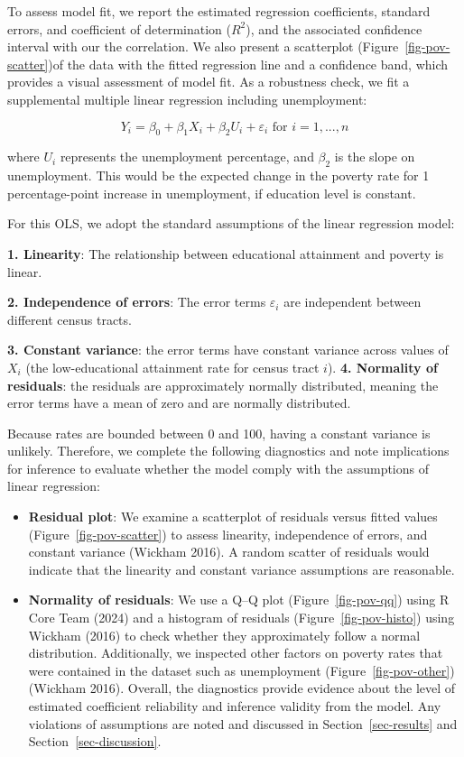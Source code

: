 \documentclass[
  letterpaper,
  DIV=11,
  numbers=noendperiod]{scrartcl}
\begin{document}
To assess model fit, we report the estimated regression coefficients,
standard errors, and coefficient of determination (\(R^2\)), and the
associated confidence interval with our the correlation. We also present
a scatterplot (Figure~\ref{fig-pov-scatter})of the data with the fitted
regression line and a confidence band, which provides a visual
assessment of model fit. As a robustness check, we fit a supplemental
multiple linear regression including unemployment:

\[Y_i = \beta_0 + \beta_1X_i + \beta_2U_i +\varepsilon_i \text{ for }i=1,...,n\]

where \(U_i\) represents the unemployment percentage, and \(\beta_2\) is
the slope on unemployment. This would be the expected change in the
poverty rate for 1 percentage-point increase in unemployment, if
education level is constant.

For this OLS, we adopt the standard assumptions of the linear regression
model:

\textbf{1. Linearity}: The relationship between educational attainment
and poverty is linear.

\textbf{2. Independence of errors}: The error terms \(\varepsilon_i\)
are independent between different census tracts.

\textbf{3. Constant variance}: the error terms have constant variance
across values of \(X_i\) (the low-educational attainment rate for census
tract \(i\)). \textbf{4. Normality of residuals}: the residuals are
approximately normally distributed, meaning the error terms have a mean
of zero and are normally distributed.

Because rates are bounded between 0 and 100, having a constant variance
is unlikely. Therefore, we complete the following diagnostics and note
implications for inference to evaluate whether the model comply with the
assumptions of linear regression:

\begin{itemize}
\item
  \textbf{Residual plot}: We examine a scatterplot of residuals versus
  fitted values (Figure~\ref{fig-pov-scatter}) to assess linearity,
  independence of errors, and constant variance (Wickham 2016). A random
  scatter of residuals would indicate that the linearity and constant
  variance assumptions are reasonable.
\item
  \textbf{Normality of residuals}: We use a Q--Q plot
  (Figure~\ref{fig-pov-qq}) using R Core Team (2024) and a histogram of
  residuals (Figure~\ref{fig-pov-histo}) using Wickham (2016) to check
  whether they approximately follow a normal distribution. Additionally,
  we inspected other factors on poverty rates that were contained in the
  dataset such as unemployment (Figure~\ref{fig-pov-other}) (Wickham
  2016). Overall, the diagnostics provide evidence about the level of
  estimated coefficient reliability and inference validity from the
  model. Any violations of assumptions are noted and discussed in
  Section~\ref{sec-results} and Section~\ref{sec-discussion}.
\end{itemize}
\end{document}
